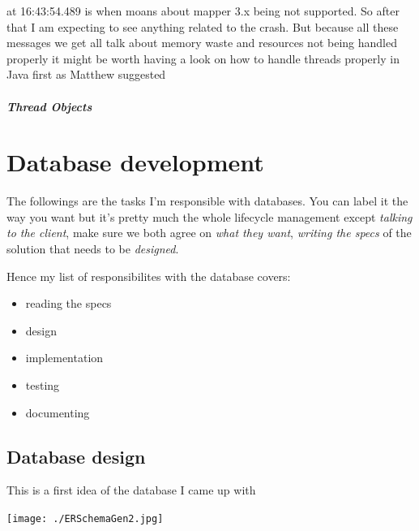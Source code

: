 \documentclass[a4paper,12pt]{book}
\begin{document}
at 16:43:54.489 is when moans about mapper 3.x being not supported. So after that I am expecting to see anything related to the crash. But because all these messages we get all talk about memory waste and resources not being handled properly it might be worth having a look on how to handle threads properly in Java first as Matthew suggested

\subsubsection{Thread Objects}
%
%
\part{Database development}

The followings are the tasks I'm responsible with databases. You can label it the way you want but it's pretty much the whole lifecycle management except \emph{talking to the client}, make sure we both agree on \emph{what they want}, \emph{writing the specs} of the solution that needs to be \emph{designed}.

Hence my list of responsibilites with the database covers:

\begin{itemize}
\item {reading the specs}
\item design
\item implementation
\item testing 
\item documenting
\end{itemize}

\clearpage

\chapter{Database design}
This is a first idea of the database I came up with

\noindent\texttt{[image: ./ERSchemaGen2.jpg]}
\end{document}
